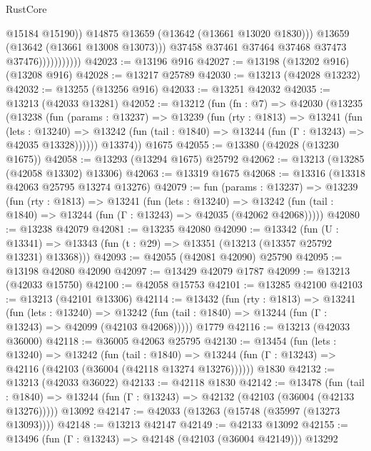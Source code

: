 \begin{lexlean}{RustCore}
\begin{coremodule}
                                  @15184
                                  @15190))
                              @14875
                              @13659
                              (@13642 (@13661 @13020 @1830)))
                            @13659
                            (@13642 (@13661 @13008 @13073)))
                          @37458
                          @37461
                          @37464
                          @37468
                          @37473
                          @37476)))))))))))
@42023 := @13196 @916
@42027 := @13198 (@13202 @916) (@13208 @916)
@42028 := @13217 @25789
@42030 := @13213 (@42028 @13232)
@42032 := @13255 (@13256 @916)
@42033 := @13251 @42032
@42035 := @13213 (@42033 @13281)
@42052 := @13212
    (fun (fn : @7) =>
    @42030
      (@13235
        (@13238
          (fun (params : @13237) =>
          @13239
            (fun (rty : @1813) =>
            @13241
              (fun (lets : @13240) =>
              @13242 (fun (tail : @1840) => @13244 (fun (Γ : @13243) => @42035 @13328))))))
        @13374))
    @1675
@42055 := @13380 (@42028 (@13230 @1675))
@42058 := @13293 (@13294 @1675) @25792
@42062 := @13213 (@13285 (@42058 @13302) @13306)
@42063 := @13319 @1675
@42068 := @13316 (@13318 @42063 @25795 @13274 @13276)
@42079 := fun (params : @13237) =>
  @13239
    (fun (rty : @1813) =>
    @13241
      (fun (lets : @13240) =>
      @13242 (fun (tail : @1840) => @13244 (fun (Γ : @13243) => @42035 (@42062 @42068)))))
@42080 := @13238 @42079
@42081 := @13235 @42080
@42090 := @13342
    (fun (U : @13341) => @13343 (fun (t : @29) => @13351 (@13213 (@13357 @25792 @13231) @13368)))
@42093 := @42055 (@42081 @42090) @25790
@42095 := @13198 @42080 @42090
@42097 := @13429 @42079 @1787
@42099 := @13213 (@42033 @15750)
@42100 := @42058 @15753
@42101 := @13285 @42100
@42103 := @13213 (@42101 @13306)
@42114 := @13432
    (fun (rty : @1813) =>
    @13241
      (fun (lets : @13240) =>
      @13242 (fun (tail : @1840) => @13244 (fun (Γ : @13243) => @42099 (@42103 @42068)))))
    @1779
@42116 := @13213 (@42033 @36000)
@42118 := @36005 @42063 @25795
@42130 := @13454
    (fun (lets : @13240) =>
    @13242
      (fun (tail : @1840) =>
      @13244 (fun (Γ : @13243) => @42116 (@42103 (@36004 (@42118 @13274 @13276))))))
    @1830
@42132 := @13213 (@42033 @36022)
@42133 := @42118 @1830
@42142 := @13478
    (fun (tail : @1840) => @13244 (fun (Γ : @13243) => @42132 (@42103 (@36004 (@42133 @13276)))))
    @13092
@42147 := @42033 (@13263 (@15748 (@35997 (@13273 @13093))))
@42148 := @13213 @42147
@42149 := @42133 @13092
@42155 := @13496 (fun (Γ : @13243) => @42148 (@42103 (@36004 @42149))) @13292

\end{coremodule}
\end{lexlean}
